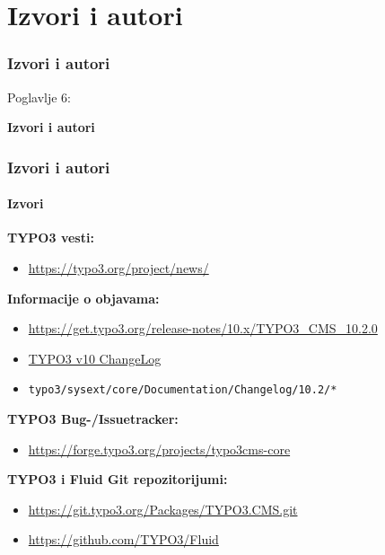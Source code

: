%

\section{Izvori i autori}
\begin{frame}[fragile]
	\frametitle{Izvori i autori}

	\begin{center}\huge{Poglavlje 6:}\end{center}
	\begin{center}\huge{\color{typo3darkgrey}\textbf{Izvori i autori}}\end{center}

\end{frame}


\begin{frame}[fragile]
	\frametitle{Izvori i autori}
	\framesubtitle{Izvori}

	\textbf{TYPO3 vesti:}
		\begin{itemize}\smaller
			\item \url{https://typo3.org/project/news/}
		\end{itemize}

	\textbf{Informacije o objavama:}
		\begin{itemize}\smaller
			\item \url{https://get.typo3.org/release-notes/10.x/TYPO3_CMS_10.2.0}
			\item \href{https://docs.typo3.org/c/typo3/cms-core/master/en-us/Changelog-10.html}{TYPO3 v10 ChangeLog}
			\item \texttt{typo3/sysext/core/Documentation/Changelog/10.2/*}
		\end{itemize}

	\textbf{TYPO3 Bug-/Issuetracker:}
		\begin{itemize}\smaller
			\item \url{https://forge.typo3.org/projects/typo3cms-core}
		\end{itemize}

	\textbf{TYPO3 i Fluid Git repozitorijumi:}
		\begin{itemize}\smaller
			\item \url{https://git.typo3.org/Packages/TYPO3.CMS.git}
			\item \url{https://github.com/TYPO3/Fluid}
		\end{itemize}

\end{frame}

